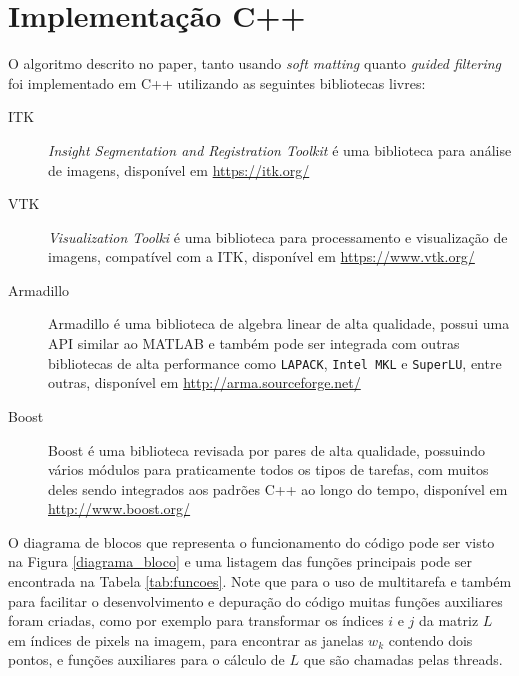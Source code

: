 \documentclass[12pt,openany, oneside,
 article, 
 a4paper, hyphens, english, brazil]{abntex2}
\begin{document}
\section{Implementação C++}
O algoritmo descrito no paper, tanto usando \textit{soft matting}  quanto \textit{guided filtering} foi implementado em C++ utilizando as seguintes bibliotecas livres:
\begin{description}
	\item[ITK] \textit{Insight Segmentation and Registration Toolkit} é uma biblioteca para análise de imagens, disponível em \url{https://itk.org/}
	\item[VTK] \textit{Visualization Toolki} é uma biblioteca para processamento e visualização de imagens, compatível com a ITK, disponível em \url{https://www.vtk.org/}
	\item[Armadillo] Armadillo é uma biblioteca de algebra linear de alta qualidade, possui uma API similar ao MATLAB e também pode ser integrada com outras bibliotecas de alta performance como \texttt{LAPACK}, \texttt{Intel MKL} e \texttt{SuperLU}, entre outras, disponível em \url{http://arma.sourceforge.net/}
	\item[Boost] Boost é uma biblioteca revisada por pares de alta qualidade, possuindo vários módulos para praticamente todos os tipos de tarefas, com muitos deles sendo integrados aos padrões C++ ao longo do tempo, disponível em \url{http://www.boost.org/}
\end{description}

O diagrama de blocos que representa o funcionamento do código pode ser visto na Figura \ref{diagrama_bloco} e uma listagem das funções principais pode ser encontrada na Tabela \ref{tab:funcoes}. Note que para o uso de multitarefa e também para facilitar o desenvolvimento e depuração do código muitas funções auxiliares foram criadas, como por exemplo para transformar os índices $i$ e $j$ da matriz $L$ em índices de pixels na imagem, para encontrar as janelas $w_k$ contendo dois pontos, e funções auxiliares para o cálculo de $L$ que são chamadas pelas threads.
\end{document}
